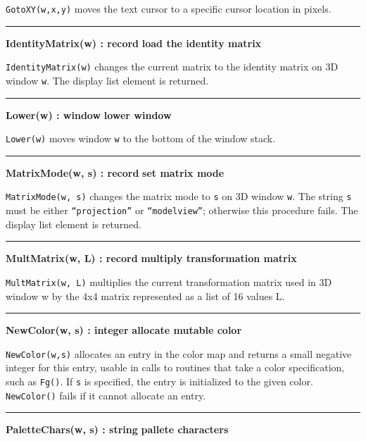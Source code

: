 \noindent
\texttt{GotoXY(w,x,y)} moves the text cursor to a specific cursor
location in pixels.

\bigskip\hrule\vspace{0.1cm}
\noindent
{\bf IdentityMatrix(w) : record } \hfill {\bf load the identity matrix}

\noindent
\texttt{IdentityMatrix(w)} changes the current matrix to the identity
matrix on 3D window \texttt{w}. The display list element is returned. 

\bigskip\hrule\vspace{0.1cm}
\noindent
{\bf Lower(w) : window } \hfill {\bf lower window}

\noindent
\texttt{Lower(w)} moves window \texttt{w} to the bottom of the window
stack.

\bigskip\hrule\vspace{0.1cm}
\noindent
{\bf MatrixMode(w, s) : record } \hfill {\bf set matrix mode}

\noindent
\texttt{MatrixMode(w, s)} changes the matrix mode to \texttt{s} on 3D
window \texttt{w}. The string \texttt{s} must be either
\texttt{{\textquotedblleft}projection{\textquotedblright}} or
\texttt{{\textquotedblleft}modelview{\textquotedblright}}; otherwise
this procedure fails. The display list element is returned.

\bigskip\hrule\vspace{0.1cm}
\noindent
{\bf MultMatrix(w, L) : record } \hfill {\bf multiply transformation matrix}

\noindent
\texttt{MultMatrix(w, L)} multiplies the current transformation matrix
used in 3D window w by the 4x4 matrix represented as a list of 16
values L.

\bigskip\hrule\vspace{0.1cm}
\noindent
{\bf NewColor(w, s) : integer } \hfill {\bf allocate mutable color}

\noindent
\texttt{NewColor(w,s)} allocates an entry in the color map and returns a
small negative integer for this entry, usable in calls to routines that
take a color specification, such as \texttt{Fg()}. If \texttt{s} is
specified, the entry is initialized to the given color.
\texttt{NewColor()} fails if it cannot allocate an entry.

\bigskip\hrule\vspace{0.1cm}
\noindent
{\bf PaletteChars(w, s) : string } \hfill {\bf pallete characters}

